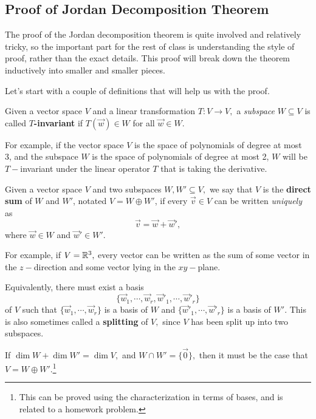 \subsection{Proof of Jordan Decomposition Theorem}
The proof of the Jordan decomposition theorem is quite involved and relatively tricky, so the important part for the rest of class is understanding the style of proof, rather than the exact details. This proof will break down the theorem inductively into smaller and smaller pieces. 

Let's start with a couple of definitions that will help us with the proof. 
\begin{definition}
Given a vector space $V$ and a linear transformation $T: V \rightarrow V,$ a \emph{subspace} $W \subseteq V$ is called \textbf{$T$-invariant} if $T(\vec{w}) \in W$ for all $\vec{w} \in W.$
\end{definition}

For example, if the vector space $V$ is the space of polynomials of degree at most 3, and the subspace $W$ is the space of polynomials of degree at most 2, $W$ will be $T-$invariant under the linear operator $T$ that is taking the derivative.

\begin{definition}
Given a vector space $V$ and two subspaces $W, W' \subseteq V,$ we say that $V$ is the \textbf{direct sum} of $W$ and $W'$, notated $V = W \oplus W'$, if every $\vec{v} \in V$ can be written \emph{uniquely} as 
\[
\vec{v} = \vec{w} + \vec{w}',
\]
where $\vec{w} \in W$ and $\vec{w}' \in W'.$
\end{definition}

For example, if $V = \mathbb R^3,$ every vector can be written as the sum of some vector in the $z-$direction and some vector lying in the $xy-$plane. 

Equivalently, there must exist a basis \[
\{\vec{w}_1, \cdots, \vec{w}_r, \vec{w}'_1, \cdots, \vec{w}'_r\}
\]
of $V$ such that 
$\{\vec{w}_1, \cdots, \vec{w}_r\}$ is a basis of $W$ and $\{\vec{w}'_1, \cdots, \vec{w}'_r\}$ is a basis of $W'$. This is also sometimes called a \textbf{splitting} of $V,$ since $V$ has been split up into two subspaces.

\begin{theorem}\label{splitting thm}
If $\dim W + \dim W' = \dim V,$ and $W \cap W' = \{\vec{0}\},$ then it must be the case that $V = W \oplus W'.$\footnote{This can be proved using the characterization in terms of bases, and is related to a homework problem.}
\end{theorem}

